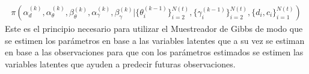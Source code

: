 \begin{align*}
\pi(\alpha_d^{(k)},\alpha_\theta^{(k)},\beta_\theta^{(k)},\alpha_\gamma^{(k)},\beta_\gamma^{(k)}|\{\theta_i^{(k-1)}\}_{i=2}^{N(t)},\{\gamma_i^{(k-1)}\}_{i=2}^{N(t)},\{d_i,c_i\}_{i=1}^{N(t)})
\end{align*}
Este es el principio necesario para utilizar el Muestreador de Gibbs de modo que se estimen los par\'ametros en base a las variables latentes que a su vez se estiman en base a las observaciones para que con los par\'ametros estimados se estimen las variables latentes que ayuden a predecir futuras observaciones. %